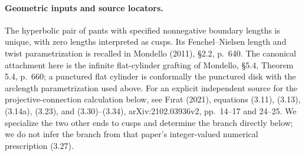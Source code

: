 \paragraph{Geometric inputs and source locators.}
The hyperbolic pair of pants with specified nonnegative boundary
lengths is unique, with zero lengths interpreted as cusps. Its
Fenchel--Nielsen length and twist parametrization is recalled in
Mondello (2011), \S2.2, p.~640. The canonical attachment here is the
infinite flat-cylinder grafting of Mondello, \S5.4,
Theorem 5.4, p.~660; a punctured flat cylinder is conformally the
punctured disk with the arclength parametrization used above.
For an explicit independent source for the projective-connection
calculation below, see F\i rat (2021), equations (3.11), (3.13),
(3.14a), (3.23), and (3.30)--(3.34), arXiv:2102.03936v2,
pp.~14--17 and 24--25. We specialize the two other ends to cusps
and determine the branch directly below; we do not infer the branch
from that paper's integer-valued numerical prescription (3.27).

